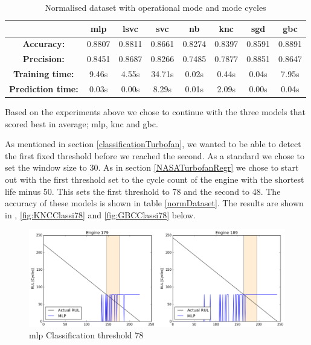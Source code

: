 \documentclass[english, a4paper]{report}
\begin{document}
{{{            \begin{table}[H]
                \centering
                \begin{tabular}{|c|c|c|c|c|c|c|c|}
                    \hline
                    \textbf{} & \textbf{\acrshort{mlp}} & \textbf{\acrshort{lsvc}} & \textbf{\acrshort{svc}} & \textbf{\acrshort{nb}} & \textbf{\acrshort{knc}} & \textbf{\acrshort{sgd}} & \textbf{\acrshort{gbc}} \\ \hline
                    \textbf{Accuracy:} & 0.8807 & 0.8811 & 0.8661 & 0.8274 & 0.8397 & 0.8591 & 0.8891 \\ \hline
                    \textbf{Precision:} & 0.8451 & 0.8687 & 0.8266 & 0.7485 & 0.7877 & 0.8851 & 0.8647 \\ \hline
                    \textbf{Training time:} & 9.46s & 4.55s & 34.71s & 0.02s & 0.44s & 0.04s & 7.95s \\ \hline
                    \textbf{Prediction time:} & 0.03s & 0.00s & 8.29s & 0.01s & 2.09s & 0.00s & 0.04s \\ \hline
                \end{tabular}
                \caption{Normalised dataset with operational mode and mode cycles}
                \label{normOpCycDataset}
            \end{table}
            
            Based on the experiments above we chose to continue with the three models that scored best in average; \acrshort{mlp}, \acrshort{knc} and \acrshort{gbc}. 
            
            \par
            
            As mentioned in section \ref{classificationTurbofan}, we wanted to be able to detect the first fixed threshold before we reached the second. As a standard we chose to set the window size to 30. As in section \ref{NASATurbofanRegr} we chose to start out with the first threshold set to the cycle count of the engine with the shortest life minus 50. This sets the first threshold to 78 and the second to 48. The accuracy of these models is shown in table \ref{normDataset}. The results are shown in , \ref{fig:KNCClassi78} and \ref{fig:GBCClassi78} below.
            
            \begin{figure}[H]
                \centering
                \includegraphics[width=\textwidth]{MLPClassi_78}
                \caption{\gls{mlp} Classification threshold 78}
                \label{fig:MLPClassi78}
            \end{figure}
            
}}}
\end{document}
